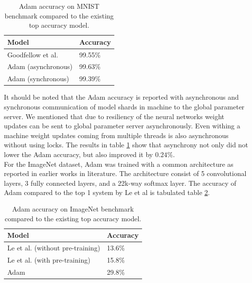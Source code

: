 \documentclass[runningheads,a4paper]{llncs}
\begin{document}
\begin{table}
	\centering
	\caption{Adam accuracy on MNIST benchmark compared to the existing top accuracy model.}
	\begin{tabular}{ |p{5cm}|p{2cm}|  }
		\hline
		\textbf{Model} & \textbf{Accuracy} \\
		\hline
		Goodfellow et al. & 99.55\%\\
		\hline
		Adam (asynchronous) & 99.63\% \\
		\hline
		Adam (synchronous) & 99.39\% \\
		
		\hline
		
	\end{tabular}
	\label{table:MNIST}
\end{table}

It should be noted that the Adam accuracy is reported with asynchronous and synchronous communication of model shards in machine to the global parameter server. We mentioned that due to resiliency of the neural networks weight updates can be sent to global parameter server asynchronously. Even withing a machine weight updates coming from multiple threads is also asynchronous without using locks. The results in table \ref{table:MNIST} show that asynchrony not only did not lower the Adam accuracy, but also improved it by $0.24\%$.\\

For the ImageNet dataset, Adam was trained with a common architecture as reported in earlier works in literature. The architecture consist of 5 convolutional layers, 3 fully connected layers, and a 22k-way softmax layer. The accuracy of Adam compared to the top 1 system by Le et al \cite{le2013building} is tabulated table \ref{table:ImageNet}.

\begin{table}
	\centering
	\caption{Adam accuracy on ImageNet benchmark compared to the existing top accuracy model.}
	\begin{tabular}{ |p{5cm}|p{2cm}|  }
		\hline
		\textbf{Model} & \textbf{Accuracy} \\
		\hline
		Le et al. (without pre-training) & 13.6\%\\
		\hline
		Le et al. (with pre-training)  & 15.8\% \\
		\hline
		Adam & 29.8\% \\
		
		\hline
		
	\end{tabular}
	\label{table:ImageNet}
\end{table}
\end{document}
